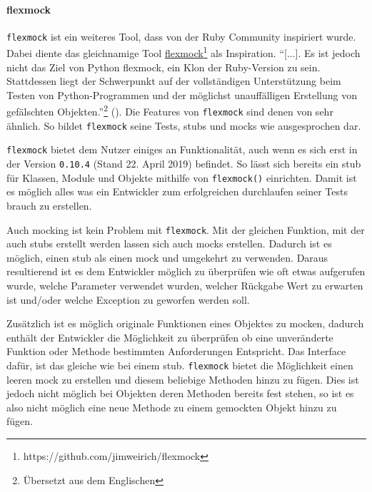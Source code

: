 \paragraph{flexmock}\label{python-tools:flexmock}\mbox{}
\newline
\lstinline{flexmock} ist ein weiteres Tool, dass von der Ruby Community
inspiriert wurde. Dabei diente das gleichnamige Tool
\href{https://github.com/jimweirich/flexmock}{flexmock}\footnote{https://github.com/jimweirich/flexmock}
als Inspiration. "`[...]. Es ist jedoch nicht das Ziel von Python flexmock, ein
Klon der Ruby-Version zu sein. Stattdessen liegt der Schwerpunkt auf der
vollständigen Unterstützung beim Testen von Python-Programmen und der möglichst
unauffälligen Erstellung von gefälschten Objekten."'\footnote{Übersetzt aus dem Englischen}
(\cite{flexmock:docs:0.10.3}). Die Features von \lstinline{flexmock} sind denen
von  sehr ähnlich. So bildet \lstinline{flexmock}
seine Tests, \glspl{stub} und \glspl{mock} wie ausgesprochen dar.
\newline

\lstinline{flexmock} bietet dem Nutzer einiges an Funktionalität, auch wenn es
sich erst in der Version \lstinline{0.10.4} (Stand 22. April 2019) befindet. So
lässt sich bereits ein \Gls{stub} für Klassen, Module und Objekte mithilfe von
\lstinline{flexmock()} einrichten. Damit ist es möglich alles was ein Entwickler
zum erfolgreichen durchlaufen seiner Tests brauch zu erstellen.

Auch \gls{mock}ing ist kein Problem mit \lstinline{flexmock}. Mit der gleichen
Funktion, mit der auch \Glspl{stub} erstellt werden lassen sich auch
\Glspl{mock} erstellen. Dadurch ist es möglich, einen \Gls{stub} als einen
\Gls{mock} und umgekehrt zu verwenden. Daraus resultierend ist es dem
Entwickler möglich zu überprüfen wie oft etwas aufgerufen wurde, welche
Parameter verwendet wurden, welcher Rückgabe Wert zu erwarten ist und/oder
welche Exception zu geworfen werden soll.

Zusätzlich ist es möglich originale Funktionen eines Objektes zu
\gls{mock}en, dadurch enthält der Entwickler die Möglichkeit
zu überprüfen ob eine unveränderte Funktion oder Methode bestimmten
Anforderungen Entspricht. Das Interface dafür, ist das gleiche wie bei einem
\Gls{stub}.
\lstinline{flexmock} bietet die Möglichkeit einen leeren \Gls{mock} zu 
erstellen und diesem beliebige Methoden hinzu zu fügen. Dies ist jedoch nicht 
möglich bei Objekten deren Methoden bereits fest stehen, so ist es also nicht 
möglich eine neue Methode zu einem gemockten Objekt hinzu zu fügen.
\newline

